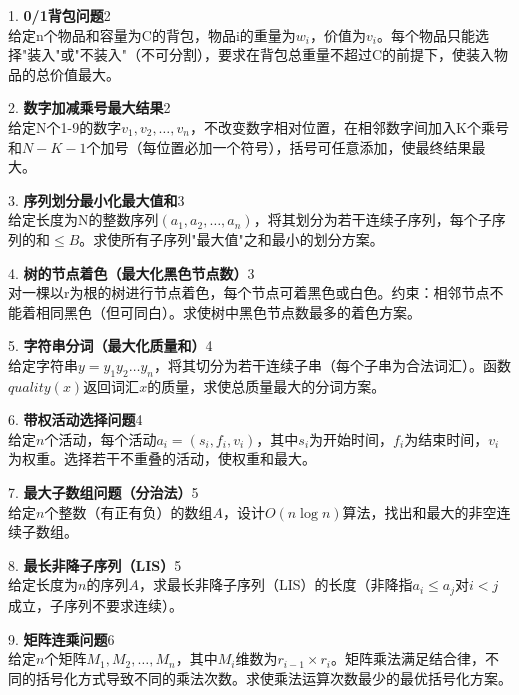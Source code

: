 \vspace{8pt}
1. \textbf{0/1背包问题}\hfill 2\\
给定n个物品和容量为C的背包，物品i的重量为$w_i$，价值为$v_i$。每个物品只能选择"装入"或"不装入"（不可分割），要求在背包总重量不超过C的前提下，使装入物品的总价值最大。

\vspace{8pt}
2. \textbf{数字加减乘号最大结果}\hfill 2\\
给定N个1-9的数字$v_1, v_2, \ldots, v_n$，不改变数字相对位置，在相邻数字间加入K个乘号和$N-K-1$个加号（每位置必加一个符号），括号可任意添加，使最终结果最大。

\vspace{8pt}
3. \textbf{序列划分最小化最大值和}\hfill 3\\
给定长度为N的整数序列$(a_1, a_2, \ldots, a_n)$，将其划分为若干连续子序列，每个子序列的和$\le B$。求使所有子序列"最大值"之和最小的划分方案。

\vspace{8pt}
4. \textbf{树的节点着色（最大化黑色节点数）}\hfill 3\\
对一棵以r为根的树进行节点着色，每个节点可着黑色或白色。约束：相邻节点不能着相同黑色（但可同白）。求使树中黑色节点数最多的着色方案。

\vspace{8pt}
5. \textbf{字符串分词（最大化质量和）}\hfill 4\\
给定字符串$y = y_1y_2\ldots y_n$，将其切分为若干连续子串（每个子串为合法词汇）。函数$quality(x)$返回词汇$x$的质量，求使总质量最大的分词方案。

\vspace{8pt}
6. \textbf{带权活动选择问题}\hfill 4\\
给定$n$个活动，每个活动$a_i = (s_i, f_i, v_i)$，其中$s_i$为开始时间，$f_i$为结束时间，$v_i$为权重。选择若干不重叠的活动，使权重和最大。

\vspace{8pt}
7. \textbf{最大子数组问题（分治法）}\hfill 5\\
给定$n$个整数（有正有负）的数组$A$，设计$O(n \log n)$算法，找出和最大的非空连续子数组。

\vspace{8pt}
8. \textbf{最长非降子序列（LIS）}\hfill 5\\
给定长度为$n$的序列$A$，求最长非降子序列（LIS）的长度（非降指$a_i \le a_j$对$i < j$成立，子序列不要求连续）。

\vspace{8pt}
9. \textbf{矩阵连乘问题}\hfill 6\\
给定$n$个矩阵$M_1, M_2, \ldots, M_n$，其中$M_i$维数为$r_{i-1} \times r_i$。矩阵乘法满足结合律，不同的括号化方式导致不同的乘法次数。求使乘法运算次数最少的最优括号化方案。

